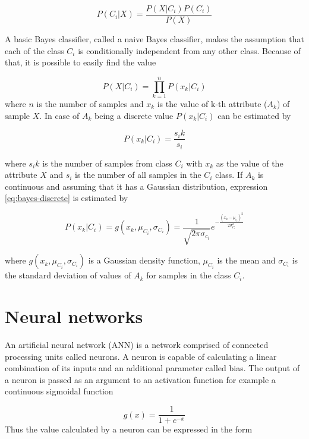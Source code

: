 \documentclass[11pt,oneside, a4paper]{report}
\begin{document}
\begin{equation} \label{eq:bayes-theorem}
P(C_i|X) = \frac{P(X|C_i)P(C_i)}{P(X)}
\end{equation}

A basic Bayes classifier, called a naive Bayes classifier, makes the assumption that each of the class $C_i$ is conditionally independent from any other class. Because of that, it is possible to easily find the value 

\begin{equation} \label{eq:naive-bayes}
P(X|C_i) = \prod_{k=1}^{n} P(x_k|C_i)
\end{equation}
where $n$ is the number of samples and $x_k$ is the value of k-th attribute ($A_k$) of sample $X$. In case of $A_k$ being a discrete value $P(x_k|C_i)$ can be estimated by
 
\begin{equation} \label{eq:bayes-discrete}
P(x_k|C_i) = \frac{s_ik}{s_i}
\end{equation}

where $s_ik$ is the number of samples from class $C_i$ with $x_k$ as the value of the attribute $X$ and $s_i$ is the number of all samples in the $C_i$ class. If $A_k$ is continuous and assuming that it has a Gaussian distribution, expression \ref{eq:bayes-discrete} is estimated by

\begin{equation} \label{eq:bayes-continuous}
P(x_k|C_i) = g(x_k, \mu_{C_i}, \sigma_{C_i}) = \frac{1}{\sqrt{2\pi\sigma_{c_i}}}e^{-\frac{(x_k-\mu_{c_i})^2}{2{\sigma_{C_i}^2}}}
\end{equation}

where $g(x_k, \mu_{C_i}, \sigma_{C_i})$ is a Gaussian density function, $\mu_{C_i}$ is the mean and $\sigma_{C_i}$ is the standard deviation of values of $A_k$ for samples in the class $C_i$.

\section{Neural networks}
An artificial neural network (ANN) is a network comprised of connected processing units called neurons. A neuron is capable of calculating a linear combination of its inputs and an additional parameter called bias. The output of a neuron is passed as an argument to an activation function for example a continuous sigmoidal function

\begin{equation} \label{eq:sigmoid}
g(x) = \frac{1}{1 + e^{-x}}
\end{equation}
Thus the value calculated by a neuron can be expressed in the form
\end{document}
